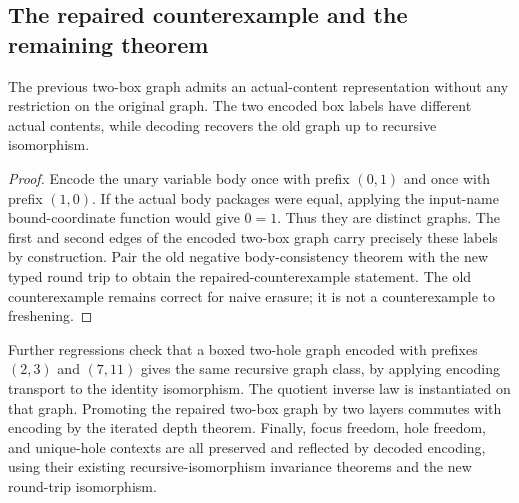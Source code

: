 
\subsection{The repaired counterexample and the remaining theorem}
\begin{proposition}
The previous two-box graph admits an actual-content representation without any
restriction on the original graph. The two encoded box labels have different
actual contents, while decoding recovers the old graph up to recursive
isomorphism.
\end{proposition}
\begin{proof}
Encode the unary variable body once with prefix $(0,1)$ and once with prefix
$(1,0)$. If the actual body packages were equal, applying the input-name
bound-coordinate function would give $0=1$. Thus they are distinct graphs.
The first and second edges of the encoded two-box graph carry precisely these
labels by construction. Pair the old negative body-consistency theorem with
the new typed round trip to obtain the repaired-counterexample statement.
The old counterexample remains correct for naive erasure; it is not a
counterexample to freshening.
\end{proof}






Further regressions check that a boxed two-hole graph encoded with prefixes
$(2,3)$ and $(7,11)$ gives the same recursive graph class, by applying encoding
transport to the identity isomorphism. The quotient inverse law is instantiated
on that graph. Promoting the repaired two-box graph by two layers commutes with
encoding by the iterated depth theorem. Finally, focus freedom, hole freedom,
and unique-hole contexts are all preserved and reflected by decoded encoding,
using their existing recursive-isomorphism invariance theorems and the new
round-trip isomorphism.

